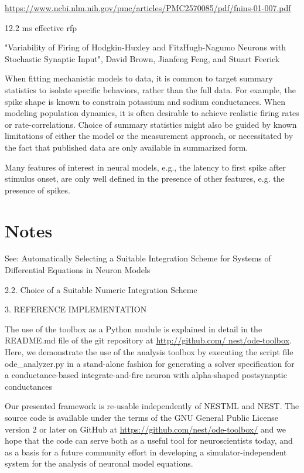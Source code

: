 \url{https://www.ncbi.nlm.nih.gov/pmc/articles/PMC2570085/pdf/fnins-01-007.pdf}



12.2 ms effective rfp

"Variability of Firing of Hodgkin-Huxley and FitzHugh-Nagumo Neurons with Stochastic Synaptic Input", David Brown, Jianfeng Feng, and Stuart Feerick 


When fitting mechanistic models to data, it is common to target summary statistics to isolate specific behaviors, rather than the full data. For example, the spike shape is known to constrain potassium and sodium conductances. When modeling population dynamics, it is often desirable to achieve realistic firing rates or rate-correlations. Choice of summary statistics might also be guided by known limitations of either the model or the measurement approach, or necessitated by the fact that published data are only available in summarized form. 

Many features of interest in neural models, e.g., the latency to first spike after stimulus onset, are only well defined in the presence of other features, e.g. the presence of spikes. 


\section{Notes}


See: Automatically Selecting a Suitable Integration Scheme for Systems of Differential Equations in Neuron Models

2.2. Choice of a Suitable Numeric Integration Scheme

3. REFERENCE IMPLEMENTATION

The use of the toolbox as a Python module is explained in detail in the README.md file of the git repository at \url{http://github.com/ nest/ode-toolbox}. Here, we demonstrate the use of the analysis toolbox by executing the script file ode\_analyzer.py in a stand-alone fashion for generating a solver specification for a conductance-based integrate-and-fire neuron with alpha-shaped postsynaptic conductances


Our presented framework is re-usable independently of NESTML and NEST. The source code is available under the terms of the GNU General Public License version 2 or later on GitHub at \url{https://github.com/nest/ode-toolbox/} and we hope that the code can serve both as a useful tool for neuroscientists today, and as a basis for a future community effort in developing a simulator-independent system for the analysis of neuronal model equations.


